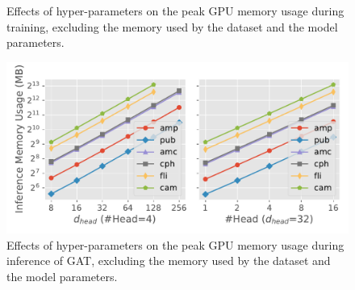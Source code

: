 \begin{figure}[H]
    \centering
    \\
    \\
    \caption{Effects of hyper-parameters on the peak GPU memory usage during training, excluding the memory used by the dataset and the model parameters.}
    \label{fig:exp_hyperparameter_memory_usage}
\end{figure}

\begin{figure}[H]
    \centering
    \includegraphics[width=0.5\columnwidth]{figs/experiments/exp_hyperparameter_on_inference_memory_usage_gat.pdf}
    \caption{Effects of hyper-parameters on the peak GPU memory usage during inference of GAT, excluding the memory used by the dataset and the model parameters.}
    \label{fig:exp_inference_hyperparameter_memory_usage_gat}
\end{figure}

